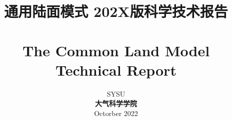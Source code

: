 \documentclass[a4paper,12pt,twoside]{report}
\begin{document}
\title{\huge {\bf 通用陆面模式 202X版科学技术报告}\\
\\
\vspace{2mm}
\fontsize {22}{24}
\bf{ The Common Land Model Technical Report }\\
\fontsize {20}{23}
 \vskip 3in
}

\author{
 \large{ SYSU }\\
 {\bf 大气科学学院}\\
 \vskip 1in
 \upshape
 \large
 \vskip 0.5in
 Octorber 2022
}

\normallinespacing

\preface


%

%
%

\body


















\appendix
{}


\renewcommand{\bibname}{References}


\end{document}
